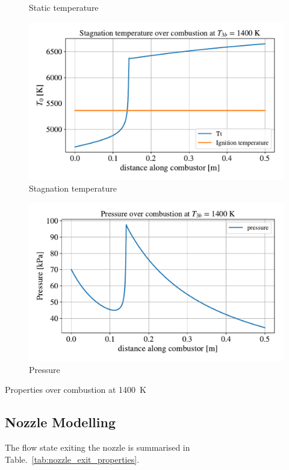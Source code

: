 \documentclass[a4paper]{article}
\begin{document}
\begin{widefigure}[10mm]
\begin{subfigure}[h]{0.49\linewidth}
        \caption{Static temperature}
        \label{subfig:temp_1400}
    \end{subfigure}
    \begin{subfigure}[h]{0.49\linewidth}
        \includegraphics[width=\linewidth]{part_2_img/stag_temp_1400.pdf}
        \caption{Stagnation temperature}
        \label{subfig:stag_temp_1400}
    \end{subfigure}
     \begin{subfigure}[h]{0.49\linewidth}
        \includegraphics[width=\linewidth]{part_2_img/pressure_1400.pdf}
        \caption{Pressure}
        \label{subfig:pressure_1400}
    \end{subfigure}
    \caption{Properties over combustion at 1400~K}
    \label{fig:properties_1400}
\end{widefigure}

\subsection{Nozzle Modelling}
The flow state exiting the nozzle is summarised in Table.~\ref{tab:nozzle_exit_properties}.
\end{document}

